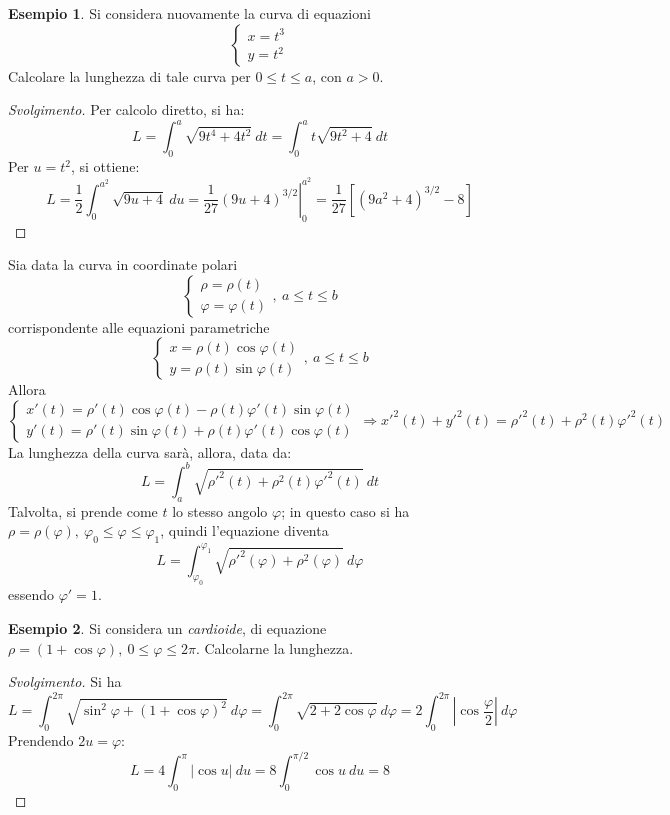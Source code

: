 \documentclass[10pt, a4paper]{scrartcl}
\newenvironment{svolgimento}{\renewcommand\qedsymbol{$\blacksquare$}\begin{proof}[Svolgimento]}{\end{proof}}
\theoremstyle{definition}
\newtheorem{esempio}{Esempio}
\numberwithin{esempio}{section}
\theoremstyle{definition}
\numberwithin{obs}{section}
\numberwithin{nota}{section}
\newcommand*\Eval[3]{\left.#1\right\rvert_{#2}^{#3}}
\numberwithin{equation}{subsection}
\begin{document}
\begin{esempio}
Si considera nuovamente la curva di equazioni 
\[
\begin{cases}
	x = t^3\\
	y = t^2
\end{cases}
\] 
Calcolare la lunghezza di tale curva per $0\le t\le a$, con $a > 0$.
\begin{svolgimento}
	Per calcolo diretto, si ha:
	\[
	L = \int_{0} ^a \sqrt{9t^4 + 4t^2} \ dt = \int_{0} ^a t\sqrt{9t^2 + 4} \ dt
	\] 
	Per $u = t^2$, si ottiene:
	\[
		L = \frac{1}{2} \int_{0} ^{a^2} \sqrt{9u + 4 }  \ du = \Eval{\frac{1}{27}(9u + 4)^{3 / 2} }{0}{a^2} = \frac{1}{27} \left[ \left(9a^2  + 4 \right) ^{3 / 2}  - 8 \right] 
	\] 
\end{svolgimento}
\end{esempio}
	Sia data la curva in coordinate polari
	\[
		\begin{cases}
	\rho  = \rho (t)\\
	\varphi = \varphi (t)
		\end{cases}, \ a\le t \le b
	\] 
corrispondente alle equazioni parametriche
\[
\begin{cases}
	 x = \rho (t) \cos \varphi (t) \\
	 y = \rho  (t) \sin \varphi (t)
\end{cases}, \ a \le t \le b
\] 
Allora 
\[
\begin{cases}
	x' (t) = \rho '(t) \cos \varphi (t) - \rho (t) \varphi '(t)\sin \varphi (t) \\
	y'(t) = \rho '(t) \sin \varphi (t) + \rho (t) \varphi '(t) \cos \varphi (t)
\end{cases} \Rightarrow x'^2 (t) + y'^2(t) = \rho '^2(t) + \rho ^2 (t) \varphi '^2(t)
\] 
La lunghezza della curva sar\`a, allora, data da:
\begin{equation}
	L = \int_{a} ^b \sqrt{\rho '^2(t) + \rho ^2 (t) \varphi '^2(t)} \ dt
\end{equation}
Talvolta, si prende come $t$ lo stesso angolo $\varphi $; in questo caso si ha $\rho  = \rho (\varphi ) , \ \varphi _0 \le  \varphi  \le \varphi _1$, quindi l'equazione diventa
\begin{equation}
	L = \int_{\varphi _0} ^{\varphi _1} \sqrt{\rho '^2(\varphi ) + \rho ^2 (\varphi )}  \ d\varphi 
\end{equation}
essendo $\varphi ' = 1$.
\begin{esempio}
Si considera un \textit{cardioide}, di equazione $\rho  = (1+ \cos\varphi ) , \ 0\le \varphi \le  2\pi $. Calcolarne la lunghezza.
\begin{svolgimento}
	Si ha 
	\[
	L = \int_{0} ^{2\pi} \sqrt{\sin^2 \varphi  + (1+ \cos\varphi )^2 }  \ d\varphi  = \int_{0} ^{2\pi} \sqrt{2 + 2 \cos \varphi  }  \ d\varphi = 2 \int_{0} ^{2\pi}\left\lvert \cos \frac{\varphi }{2}  \right\rvert   \ d\varphi 
	\] 
	Prendendo $2 u = \varphi $:
	\[
	L = 4 \int_{0} ^\pi \lvert \cos u \rvert  \ du = 8 \int_{0} ^{\pi / 2} \cos u \ du = 8 
	\] 
\end{svolgimento}
\end{esempio}
\end{document}
